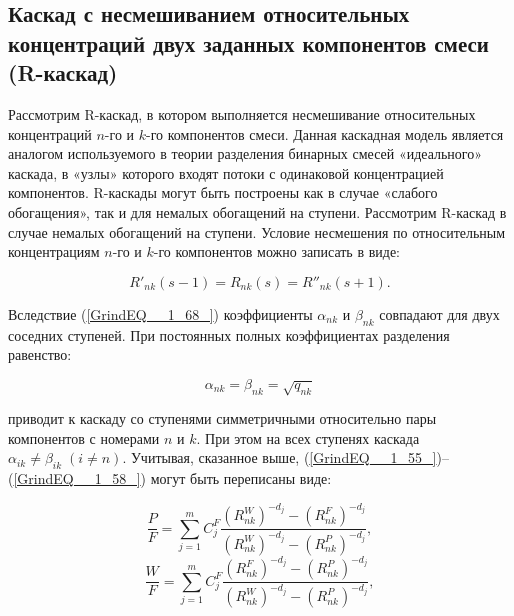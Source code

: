 \subsection{Каскад с несмешиванием относительных концентраций двух заданных компонентов смеси (R-каскад)}

Рассмотрим R-каскад, в котором выполняется несмешивание относительных концентраций $n$-го и $k$-го компонентов смеси. Данная каскадная модель является аналогом используемого в теории разделения бинарных смесей «идеального» каскада, в «узлы» которого входят потоки с одинаковой концентрацией компонентов. R-каскады могут быть построены как в случае «слабого обогащения», так и для немалых обогащений на ступени. Рассмотрим R-каскад в случае немалых обогащений на ступени. Условие несмешения по относительным концентрациям $n$-го и $k$-го компонентов можно записать в виде:

\begin{equation} \label{GrindEQ__1_68_} 
  R'_{nk} (s-1)=R_{nk} (s)=R''_{nk} (s+1).                                                 
\end{equation} 

Вследствие (\ref{GrindEQ__1_68_}) коэффициенты $\alpha _{nk} $ и $\beta _{nk} $ совпадают для двух соседних ступеней. При постоянных полных коэффициентах разделения равенство:

\begin{equation} \label{GrindEQ__1_69_} 
  \alpha _{nk} =\beta _{nk} =\sqrt{q_{nk} }  
\end{equation} 

приводит к каскаду со ступенями симметричными относительно пары компонентов с номерами $n$ и $k$. При этом на всех ступенях каскада $\alpha _{ik} \ne \beta _{ik} \; (i\ne n)$. Учитывая, сказанное выше, (\ref{GrindEQ__1_55_})--(\ref{GrindEQ__1_58_}) могут быть переписаны виде:
  

\begin{equation} \label{GrindEQ__1_70_} 
  \frac{P}{F} =\sum _{j=1}^{m}C_{j}^{F} \frac{(R_{nk}^{W} )^{-d_{j} } -(R_{nk}^{F} )^{-d_{j} } }{(R_{nk}^{W} )^{-d_{j} } -(R_{nk}^{P} )^{-d_{j} } }  ,                                            
  \end{equation} 
  \begin{equation} \label{GrindEQ__1_71_} 
  \frac{W}{F} =\sum _{j=1}^{m}C_{j}^{F} \frac{(R_{nk}^{F} )^{-d_{j} } -(R_{nk}^{P} )^{-d_{j} } }{(R_{nk}^{W} )^{-d_{j} } -(R_{nk}^{P} )^{-d_{j} } }  ,                                        
\end{equation} 

